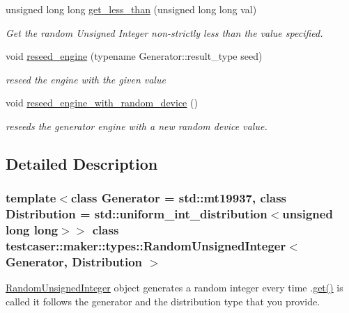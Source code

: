\begin{DoxyCompactItemize}
unsigned long long \hyperlink{classtestcaser_1_1maker_1_1types_1_1RandomUnsignedInteger_aa13e775f49786618884633ce67aa5d32}{get\+\_\+less\+\_\+than} (unsigned long long val)
\begin{DoxyCompactList}\small\item\em Get the random Unsigned Integer non-\/strictly less than the value specified. \end{DoxyCompactList}\item 
void \hyperlink{classtestcaser_1_1maker_1_1types_1_1RandomUnsignedInteger_ac0ec747e5fe2701bd3533866e97ffcf7}{reseed\+\_\+engine} (typename Generator\+::result\+\_\+type seed)
\begin{DoxyCompactList}\small\item\em reseed the engine with the given value \end{DoxyCompactList}\item 
\mbox{\label{classtestcaser_1_1maker_1_1types_1_1RandomUnsignedInteger_acd7ff23154cf792b11d8344d091100fe}} 
void \hyperlink{classtestcaser_1_1maker_1_1types_1_1RandomUnsignedInteger_acd7ff23154cf792b11d8344d091100fe}{reseed\+\_\+engine\+\_\+with\+\_\+random\+\_\+device} ()
\begin{DoxyCompactList}\small\item\em reseeds the generator engine with a new random device value. \end{DoxyCompactList}\end{DoxyCompactItemize}


\subsection{Detailed Description}
\subsubsection*{template$<$class Generator = std\+::mt19937, class Distribution = std\+::uniform\+\_\+int\+\_\+distribution$<$unsigned long long$>$$>$\newline
class testcaser\+::maker\+::types\+::\+Random\+Unsigned\+Integer$<$ Generator, Distribution $>$}

\hyperlink{classtestcaser_1_1maker_1_1types_1_1RandomUnsignedInteger}{Random\+Unsigned\+Integer} object generates a random integer every time .\hyperlink{classtestcaser_1_1maker_1_1types_1_1RandomUnsignedInteger_a73504939f740445d56b0bd00257f5480}{get()} is called it follows the generator and the distribution type that you provide. 


